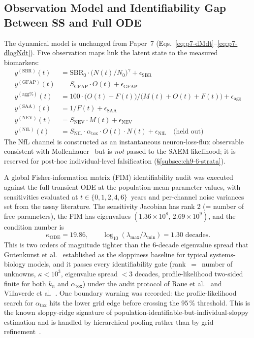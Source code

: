 \subsection{Observation Model and Identifiability Gap Between SS and Full ODE}
\label{subsec:ch9-6-identifiability}

The dynamical model is unchanged from Paper~7 (Eqs.~\eqref{eq:p7-dMdt}--\eqref{eq:p7-dlogNdt}). Five observation maps link the latent state to the measured biomarkers:
\begin{align*}
y^{(\text{SBR})}(t)       &= \text{SBR}_0 \cdot \bigl(N(t)/N_0\bigr)^{\gamma} + \epsilon_\text{SBR} \\
y^{(\text{GFAP})}(t)      &= S_\text{GFAP} \cdot O(t) + \epsilon_\text{GFAP} \\
y^{(\text{agg}\%)}(t)     &= 100 \cdot \bigl(O(t) + F(t)\bigr) / \bigl(M(t) + O(t) + F(t)\bigr) + \epsilon_\text{agg} \\
y^{(\text{SAA})}(t)       &= 1 / F(t) + \epsilon_\text{SAA} \\
y^{(\text{NEV})}(t)       &= S_\text{NEV} \cdot M(t) + \epsilon_\text{NEV} \\
y^{(\text{NfL})}(t)       &= S_\text{NfL} \cdot \alpha_\text{tox} \cdot O(t) \cdot N(t) + \epsilon_\text{NfL} \quad \text{(held out)}
\end{align*}
The NfL channel is constructed as an instantaneous neuron-loss-flux observable consistent with Mollenhauer~\cite{mollenhauer2019longitudinal} but is \emph{not} passed to the SAEM likelihood; it is reserved for post-hoc individual-level falsification (\S\ref{subsec:ch9-6-strata}).

A global Fisher-information matrix (FIM) identifiability audit was executed against the full transient ODE at the population-mean parameter values, with sensitivities evaluated at $t \in \{0, 1, 2, 4, 6\}$~years and per-channel noise variances set from the assay literature. The sensitivity Jacobian has rank 2 (= number of free parameters), the FIM has eigenvalues $(1.36 \times 10^{8},\, 2.69 \times 10^{9})$, and the condition number is
\begin{equation*}
\kappa_\text{ODE} = 19.86, \qquad \log_{10}(\lambda_\text{max}/\lambda_\text{min}) = 1.30 \text{ decades}.
\end{equation*}
This is two orders of magnitude tighter than the 6-decade eigenvalue spread that Gutenkunst et al.~\cite{gutenkunst2007} established as the sloppiness baseline for typical systems-biology models, and it passes every identifiability gate (rank~$=$~number of unknowns, $\kappa < 10^3$, eigenvalue spread $< 3$ decades, profile-likelihood two-sided finite for both $k_n$ and $\alpha_\text{tox}$) under the audit protocol of Raue et al.~\cite{raue2009} and Villaverde et al.~\cite{villaverde2016}. One boundary warning was recorded: the profile-likelihood search for $\alpha_\text{tox}$ hits the lower grid edge before crossing the 95\,\% threshold. This is the known sloppy-ridge signature of population-identifiable-but-individual-sloppy estimation and is handled by hierarchical pooling rather than by grid refinement~\cite{veronneau2020}.

